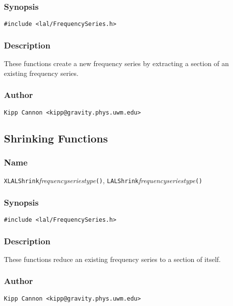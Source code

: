 \subsubsection{Synopsis}

\begin{verbatim}
#include <lal/FrequencySeries.h>
\end{verbatim}


\subsubsection{Description}

These functions create a new frequency series by extracting a section of an
existing frequency series.

\subsubsection{Author}

\verb|Kipp Cannon <kipp@gravity.phys.uwm.edu>|


\subsection{Shrinking Functions}

\subsubsection{Name}

\texttt{XLALShrink}\textit{frequencyseriestype}\texttt{()},
\texttt{LALShrink}\textit{frequencyseriestype}\texttt{()}

\subsubsection{Synopsis}

\begin{verbatim}
#include <lal/FrequencySeries.h>
\end{verbatim}


\subsubsection{Description}

These functions reduce an existing frequency series to a section of itself.

\subsubsection{Author}

\verb|Kipp Cannon <kipp@gravity.phys.uwm.edu>|

